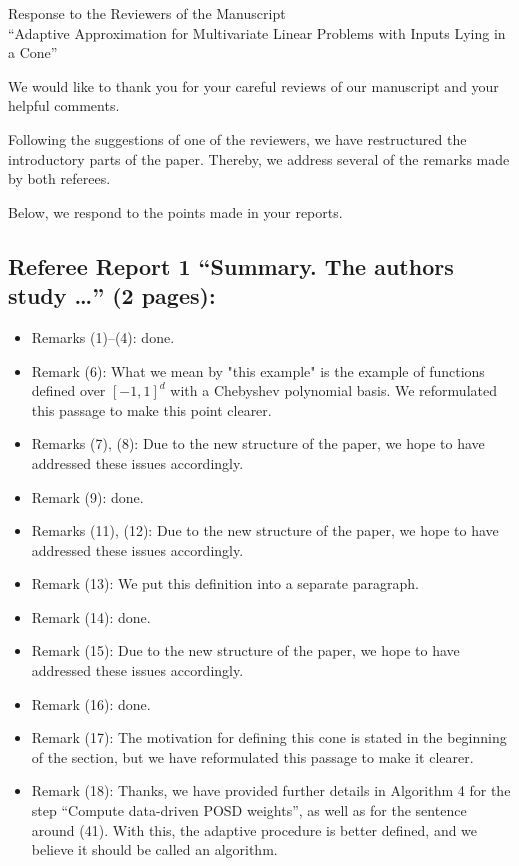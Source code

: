 \documentclass[11pt]{article}
\begin{document}
\begin{center}
 
{\Large Response to the Reviewers of the Manuscript\\
``Adaptive Approximation for Multivariate Linear Problems with Inputs Lying in a Cone''}
\end{center}

\medskip

\noindent We would like to thank you for your careful reviews of our manuscript and your helpful comments. 

Following the suggestions of one of the reviewers, we have restructured the introductory parts of the paper. Thereby, we address several of the remarks 
made by both referees. 

Below, we respond to the points made in your reports.

\subsection*{Referee Report 1 ``Summary. The authors study \ldots '' (2 pages):}

\begin{itemize}
\item Remarks (1)--(4): done. 
\item Remark (6): What we mean by "this example" is the example of functions defined over $[-1,1]^d$ with a Chebyshev polynomial basis. We reformulated this passage to make this point clearer. 
\item Remarks (7), (8): Due to the new structure of the paper, we hope to have addressed these issues accordingly. 
\item Remark (9): done. 
\item Remarks (11), (12): Due to the new structure of the paper, we hope to have addressed these issues accordingly. 
\item Remark (13): We put this definition into a separate paragraph. 
\item Remark (14): done. 
\item Remark (15): Due to the new structure of the paper, we hope to have addressed these issues accordingly. 
\item Remark (16): done. 
\item Remark (17): The motivation for defining this cone is stated in the beginning of the section, but we have reformulated this passage to make it clearer. 
\item Remark (18): Thanks, we have provided further details in Algorithm 4 for the step ``Compute data-driven POSD weights'', as well as for the sentence around (41). With this, the adaptive procedure is better defined, and we believe it should be called an algorithm.
\end{itemize}
\end{document}
